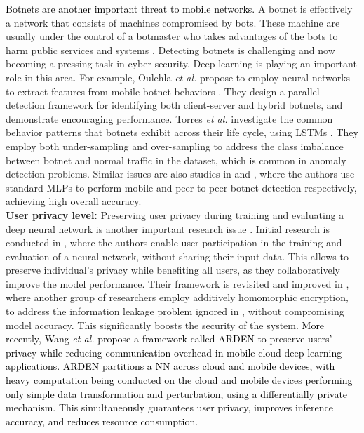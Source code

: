 \documentclass[journal,comsoc,letter]{IEEEtran}
\newcommand{\edit}[1]{\textcolor{black}{#1}}
\newcommand{\rev}[1]{\textcolor{black}{#1}}
\begin{document}
 \edit{Botnets are another important threat to mobile networks.} A botnet is effectively a network that consists of machines compromised by bots. These machine are usually under the control of a botmaster who takes advantages of the bots to harm public services and systems \cite{rodriguez2013survey}. Detecting botnets is challenging and now becoming a pressing task in cyber security. 
Deep learning is playing an important role in this area. For example, Oulehla \emph{et al.} propose to employ neural networks to extract features from mobile botnet behaviors \cite{oulehla2016detection}. They design a parallel detection framework for identifying both client-server and hybrid botnets, and demonstrate encouraging performance. Torres \emph{et al.} investigate the common behavior patterns that botnets exhibit across their life cycle, using LSTMs \cite{torres2016analysis}. They employ both under-sampling  and  over-sampling to address the class imbalance between botnet and normal traffic in the dataset, which is common in anomaly detection problems. Similar issues are also studies in \cite{eslahi2016mobile} and \cite{alauthaman2016p2p}, where the authors use standard MLPs to perform mobile and peer-to-peer botnet detection respectively, achieving high overall accuracy.\\

\noindent\textbf{User privacy level:} Preserving user privacy during training and evaluating a deep neural network is another important research issue \cite{liu2016collaborative}. Initial research is conducted in \cite{shokri2015privacy}, where the authors enable user participation in the training and evaluation of a neural network, without sharing their input data. This allows to preserve individual's privacy while benefiting all users, as they collaboratively improve the model performance. Their framework is revisited and improved in \cite{aono2017privacy}, where another group of researchers employ additively homomorphic encryption, to address the information leakage problem ignored in \cite{shokri2015privacy}, without compromising model accuracy. This significantly boosts the security of the system.  \rev{More recently, Wang \emph{et al.} \cite{wang2018not} propose a framework called ARDEN to preserve users' privacy while reducing communication overhead in mobile-cloud deep learning applications. ARDEN partitions a NN across cloud and mobile devices, with heavy computation being conducted on the cloud and mobile devices performing only simple data transformation and perturbation, using a differentially private mechanism. This simultaneously guarantees user privacy, improves inference accuracy, and reduces resource consumption.}
\end{document}
